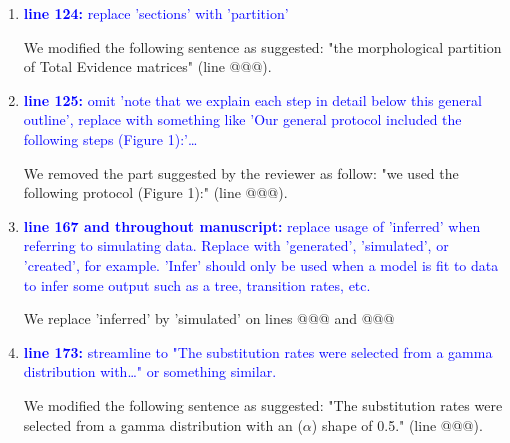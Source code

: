 \documentclass[12pt,letterpaper]{article}
\begin{document}
\begin{enumerate}
(2) - the second point underlined by the reviewer in this specific comment strikes use as really interesting. However, we considered this study to be already long and complex. We therefore think that adding an extra question to this study (i.e. what is the effect of missing data on the morphological substitution rate parameter estimates?) might loose the reader.
Nonetheless, we added the result of such analysis in the \textbf{Appendix-A Morphological rates estimations results} section.

\item{\textcolor{blue}{\textbf{line 124:} replace 'sections' with 'partition'}}

We modified the following sentence as suggested: "the morphological partition of Total Evidence matrices" (line @@@).

\item{\textcolor{blue}{\textbf{line 125:} omit 'note that we explain each step in detail below this general outline', replace with something like 'Our general protocol included the following steps (Figure 1):'…}}

We removed the part suggested by the reviewer as follow: "we used the following protocol (Figure 1):" (line @@@).

\item{\textcolor{blue}{\textbf{line 167 and throughout manuscript:} replace usage of 'inferred' when referring to simulating data. Replace with 'generated', 'simulated', or 'created', for example. 'Infer' should only be used when a model is fit to data to infer some output such as a tree, transition rates, etc. }}

We replace 'inferred' by 'simulated' on lines @@@ and @@@ %

\item{\textcolor{blue}{\textbf{line 173:} streamline to "The substitution rates were selected from a gamma distribution with…" or something similar. }}

We modified the following sentence as suggested: "The substitution rates were selected from a gamma distribution with an ($\alpha$) shape of 0.5." (line @@@).


\end{enumerate}
\end{document}
